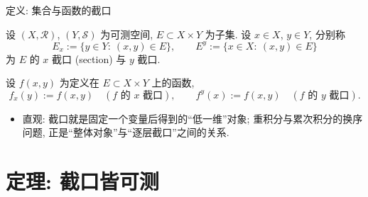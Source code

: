 \begin{frame}{定义: 集合与函数的截口}

\begin{Def}
设 $(X, \mathscr{R})$, $(Y, \mathscr{S})$ 为可测空间, $E \subset X \times Y$ 为子集.
设 $x \in X$, $y \in Y$, 分别称
\[
E_x := \{ y \in Y:\ (x, y) \in E \},
\qquad
E^y := \{ x \in X:\ (x, y) \in E \}
\]
为 $E$ 的 \alert{$x$ 截口} (section) 与 \alert{$y$ 截口}.
\end{Def}

\pause

\begin{Def}
设 $f(x, y)$ 为定义在 $E \subset X \times Y$ 上的函数,
\[
f_x(y) := f(x, y) \quad (\text{$f$ 的 $x$ 截口}),
\qquad
f^y(x) := f(x, y) \quad (\text{$f$ 的 $y$ 截口}) .
\]
\end{Def}

\pause

\begin{itemize}
\item 直观: 截口就是\alert{固定一个变量}后得到的``低一维''对象;
  重积分与累次积分的换序问题, 正是``整体对象''与``逐层截口''之间的关系.
\end{itemize}

\end{frame}


\section[截口可测]{定理: 截口皆可测}


